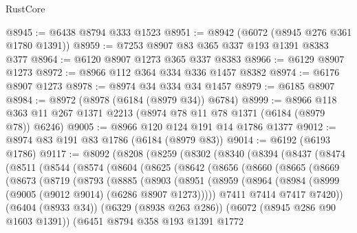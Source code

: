\begin{lexlean}{RustCore}
\begin{coremodule}
@8945 := @6438 @8794 @333 @1523
@8951 := @8942 (@6072 (@8945 @276 @361 @1780 @1391))
@8959 := @7253 @8907 @83 @365 @337 @193 @1391 @8383 @377
@8964 := @6120 @8907 @1273 @365 @337 @8383
@8966 := @6129 @8907 @1273
@8972 := @8966 @112 @364 @334 @336 @1457 @8382
@8974 := @6176 @8907 @1273
@8978 := @8974 @34 @334 @34 @1457
@8979 := @6185 @8907
@8984 := @8972 (@8978 (@6184 (@8979 @34)) @6784)
@8999 := @8966 @118 @363 @11 @267 @1371 @2213 (@8974 @78 @11 @78 @1371 (@6184 (@8979 @78)) @6246)
@9005 := @8966 @120 @124 @191 @14 @1786 @1377
@9012 := @8974 @83 @191 @83 @1786 (@6184 (@8979 @83))
@9014 := @6192 (@6193 @1786)
@9117 := @8092
    (@8208
      (@8259
        (@8302
          (@8340
            (@8394
              (@8437
                (@8474
                  (@8511
                    (@8544
                      (@8574
                        (@8604
                          (@8625
                            (@8642
                              (@8656
                                (@8660
                                  (@8665
                                    (@8669
                                      (@8673
                                        (@8719
                                          (@8793
                                            (@8885
                                              (@8903
                                                (@8951
                                                  (@8959
                                                    (@8964
                                                      (@8984
                                                        (@8999
                                                          (@9005
                                                            (@9012 @9014)
                                                            (@6286 @8907 @1273)))))
                                                    @7411
                                                    @7414
                                                    @7417
                                                    @7420))
                                                (@6404 (@8933 @34))
                                                (@6329 (@8938 @263 @286))
                                                (@6072 (@8945 @286 @90 @1603 @1391))
                                                (@6451
                                                  @8794
                                                  @358
                                                  @193
                                                  @1391
                                                  @1772

\end{coremodule}
\end{lexlean}

